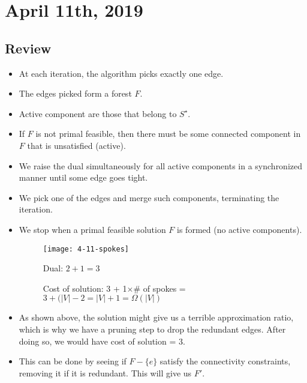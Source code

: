 \documentclass[../main/main.tex]{subfiles}
\begin{document}
\section{April 11th, 2019}
\subsection*{Review}
\begin{itemize}
	\item At each iteration, the algorithm picks exactly one edge.
	\item The edges picked form a forest $F$.
	\item Active component are those that belong to $S^{\star}$.
	\item If $F$ is not primal feasible, then there must be some connected component in $F$ that is unsatisfied (active).
	\item We raise the dual simultaneously for all active components in a synchronized manner until some edge goes tight.
	\item We pick one of the edges and merge such components, terminating the iteration.
	\item We stop when a primal feasible solution $F$ is formed (no active components).
\begin{figure}[h!]
	\centering
	\texttt{[image: 4-11-spokes]}
\caption*{Dual: $2+1=3$}
\caption*{Cost of solution: 3 + 1$\times $\# of spokes =  $3+(|V|-2=|V|+1=\Omega(|V|)$}
	\label{fig:4-11-spokes}
\end{figure}
\item As shown above, the solution might give us a terrible approximation ratio, which is why we have a pruning step to drop the redundant edges. After doing so, we would have cost of solution = 3.
\item This can be done by seeing if $F-\{e\} $ satisfy the connectivity constraints, removing it if it is redundant. This will give us $F'$. 
\end{itemize}
\end{document}
